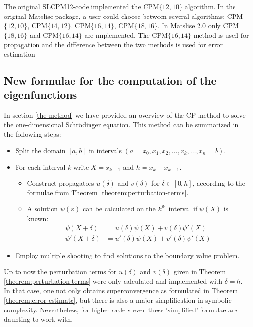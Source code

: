 The original SLCPM12-code implemented the CPM$\{12,10\}$ algorithm. In the original Matslise-package, a user could choose between several algorithms: CPM$\{12,10\}$, CPM$\{14,12\}$, CPM$\{16,14\}$, CPM$\{18,16\}$.
In Matslise 2.0 only CPM$\{18,16\}$ and CPM$\{16,14\}$ are implemented. The CPM$\{16,14\}$ method is used for propagation and the difference between the two methods is used for error estimation.

\subsection{New formulae for the computation of the eigenfunctions}\label{sec:c2_cp_in_delta}

In section \ref{the-method} we have provided an overview of the CP method to solve the one-dimensional Schrödinger equation. This method can be summarized in the following steps:
\begin{itemize}
  \item Split the domain $[a, b]$ in intervals $(a=x_0, x_1, x_2, \dots, x_k, \dots, x_n = b)$.
  \item For each interval $k$ write $X = x_{k-1}$ and $h = x_k - x_{k-1}$. \begin{itemize}
          \item Construct propagators $u(\delta)$ and $v(\delta)$ for $\delta \in [0, h]$, according to the formulae from Theorem \ref{theorem:perturbation-terms}.
          \item A solution $\psi(x)$ can be calculated on the $k^\text{th}$ interval if $\psi(X)$ is known:
                \begin{align*}
                  \psi(X+\delta)  & = u(\delta)\psi(X) + v(\delta)\psi'(X)   \\
                  \psi'(X+\delta) & = u'(\delta)\psi(X) + v'(\delta)\psi'(X)
                \end{align*}
        \end{itemize}
  \item Employ multiple shooting to find solutions to the boundary value problem.
\end{itemize}

Up to now the perturbation terms for $u(\delta)$ and $v(\delta)$ given in Theorem \ref{theorem:perturbation-terms} were only calculated and implemented with $\delta = h$. In that case, one not only obtains superconvergence as formulated in Theorem \ref{theorem:error-estimate}, but there is also a major simplification in symbolic complexity. Nevertheless, for higher orders even these 'simplified' formulae are daunting to work with.

